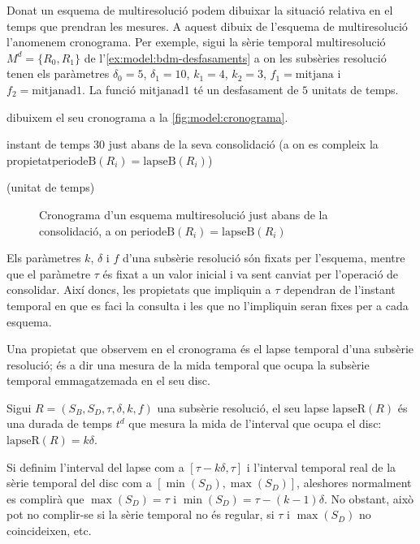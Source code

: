 Donat un esquema de multiresolució podem dibuixar la situació relativa
en el temps que prendran les mesures. A aquest dibuix de l'esquema de
multiresolució l'anomenem cronograma. Per exemple, sigui la sèrie
temporal multiresolució $M^d=\{R_0,R_1\}$ de l'\autoref{ex:model:bdm-desfasaments} a on les subsèries resolució tenen els paràmetres 
$\delta_0=5$, $\delta_1=10$, $k_1=4$, $k_2=3$, $f_1=\text{mitjana}$ i $f_2=\text{mitjanad1}$. La funció $\text{mitjanad1}$ té un desfasament de $5$ unitats de temps. 


dibuixem el seu cronograma a la \autoref{fig:model:cronograma}.

instant de temps $30$ just abans de la seva consolidació (a on es compleix la propietat$\text{periodeB}(R_i)=\text{lapseB}(R_i)$)

(unitat de temps)





\begin{figure}[tp]
  \centering
  
  \caption{Cronograma d'un esquema multiresolució just abans de la consolidació, a on $\text{periodeB}(R_i)=\text{lapseB}(R_i)$}
  \label{fig:model:cronograma}
\end{figure}


Els paràmetres $k$, $\delta$ i $f$ d'una subsèrie resolució són fixats
per l'esquema, mentre que el paràmetre $\tau$ és fixat a un valor
inicial i va sent canviat per l'operació de consolidar. Així doncs,
les propietats que impliquin a $\tau$ dependran de l'instant temporal
en que es faci la consulta i les que no l'impliquin seran fixes per a
cada esquema.

Una propietat que observem en el cronograma és el lapse temporal d'una
subsèrie resolució; és a dir una mesura de la mida temporal que ocupa
la subsèrie temporal emmagatzemada en el seu disc.
\begin{definition} %
  Sigui $R=(S_B,S_D,\tau,\delta,k,f)$ una subsèrie resolució, el seu
  lapse $\text{lapseR}(R)$ és una durada de temps $t^d$ que mesura la
  mida de l'interval que ocupa el disc: $\text{lapseR}(R) = k\delta$.
\end{definition}


Si definim l'interval del lapse com a $[\tau - k\delta, \tau]$
i l'interval temporal real de la sèrie temporal del disc com a
$[\min(S_D),\max(S_D)]$, aleshores normalment es complirà que
$\max(S_D)=\tau$ i $\min(S_D)=\tau - (k-1)\delta$. No obstant, això
pot no complir-se si la sèrie temporal no és regular, si $\tau$ i
$\max(S_D)$ no coincideixen, etc. 

